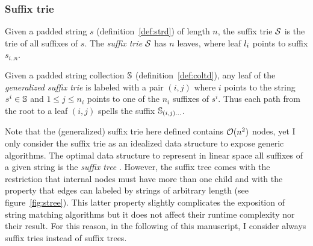 \subsubsection{Suffix trie}

\begin{definition}
Given a padded string $s$ (definition~\ref{def:strd}) of length $n$, the suffix trie $\mathcal {S}$ is the trie of all suffixes of $s$.
The \emph{suffix trie} $\mathcal {S}$ has $n$ leaves, where leaf $l_i$ points to suffix $s_{i..n}$.
\end{definition}
\begin{definition}
Given a padded string collection $\mathbb {S}$ (definition~\ref{def:coltd}), any leaf of the \emph{generalized suffix trie} is labeled with a pair $(i,j)$ where $i$ points to the string $s^i \in \mathbb {S}$ and $1 \leq j \leq n_i$ points to one of the $n_i$ suffixes of $s^i$.
Thus each path from the root to a leaf $(i,j)$ spells the suffix $\mathbb {S}_{(i,j) \dots}$.
\end{definition}

Note that the (generalized) suffix trie here defined contains $\mathcal{O}(n^2)$ nodes, yet I only consider the suffix trie as an idealized data structure to expose generic algorithms.
The optimal data structure to represent in linear space all suffixes of a given string is the \emph{suffix tree} \citep{Morrison1968}.
However, the suffix tree comes with the restriction that internal nodes must have more than one child and with the property that edges can labeled by strings of arbitrary length (see figure~\ref{fig:stree}).
This latter property slightly complicates the exposition of string matching algorithms but it does not affect their runtime complexity nor their result.
For this reason, in the following of this manuscript, I consider \wlogs always suffix tries instead of suffix trees.

\begin{figure}[h]
\caption[Example of suffix trie and suffix tree]{Suffix trie and suffix tree of the string {\ttfamily ANANAS\$} .}
\label{fig:stree}
\begin{subfigure}{.5\textwidth}
\begin{center}

\end{center}
\end{subfigure}%
\begin{subfigure}{.5\textwidth}
\begin{center}

\end{center}
\end{subfigure}
\end{figure}

